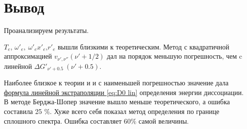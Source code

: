 \documentclass{article}
\begin{document}
\section{Вывод} 

Проанализируем результаты. 

$T_e$, $\omega'_e,~\omega'_e x'_e$,$r'_e$ вышли близкими к теоретическим. Метод с квадратичной аппроксимацией $v_{\nu', \nu''} (\nu'+1/2)$ дал на порядок меньшую погрешность, чем c линейной $\Delta G'_{\nu'+0.5} ~(\nu' +0.5)$.  

Наиболее близкое к теории и и с наименьшей погрешностью значение дала \hyperref[eq:D0 lin]{формула линейной экстраполяции \ref*{eq:D0 lin}} определения энергии диссоциации. В методе Берджа-Шопер значение вышло меньше теоретического, а ошибка составила 25 $\%$. Хуже всего себя показал метод определения по границе сплошного спектра. Ошибка составляет 60$\%$ самой величины. 
\end{document}
